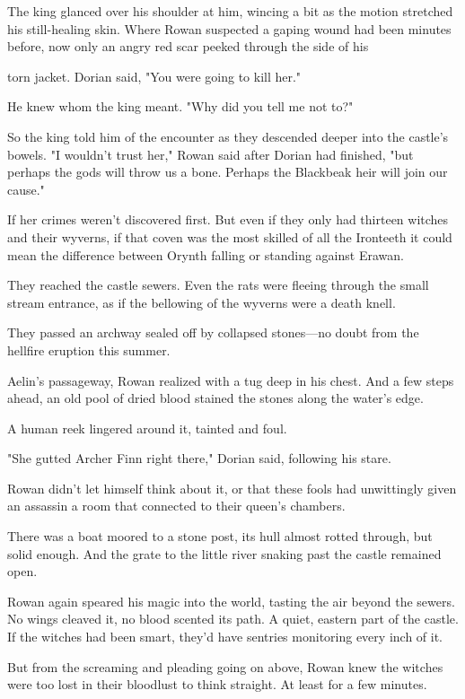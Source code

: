 The king glanced over his shoulder at him, wincing a bit as the motion stretched his still-healing skin. Where Rowan suspected a gaping wound had been minutes before, now only an angry red scar peeked through the side of his

torn jacket. Dorian said, "You were going to kill her."

He knew whom the king meant. "Why did you tell me not to?"

So the king told him of the encounter as they descended deeper into the castle's bowels. "I wouldn't trust her," Rowan said after Dorian had finished, "but perhaps the gods will throw us a bone. Perhaps the Blackbeak heir will join our cause."

If her crimes weren't discovered first. But even if they only had thirteen witches and their wyverns, if that coven was the most skilled of all the Ironteeth  it could mean the difference between Orynth falling or standing against Erawan.

They reached the castle sewers. Even the rats were fleeing through the small stream entrance, as if the bellowing of the wyverns were a death knell.

They passed an archway sealed off by collapsed stones---no doubt from the hellfire eruption this summer.

Aelin's passageway, Rowan realized with a tug deep in his chest. And a few steps ahead, an old pool of dried blood stained the stones along the water's edge.

A human reek lingered around it, tainted and foul.

"She gutted Archer Finn right there," Dorian said, following his stare.

Rowan didn't let himself think about it, or that these fools had unwittingly given an assassin a room that connected to their queen's chambers.

There was a boat moored to a stone post, its hull almost rotted through, but solid enough. And the grate to the little river snaking past the castle remained open.

Rowan again speared his magic into the world, tasting the air beyond the sewers. No wings cleaved it, no blood scented its path. A quiet, eastern part of the castle. If the witches had been smart, they'd have sentries monitoring every inch of it.

But from the screaming and pleading going on above, Rowan knew the witches were too lost in their bloodlust to think straight. At least for a few minutes.

